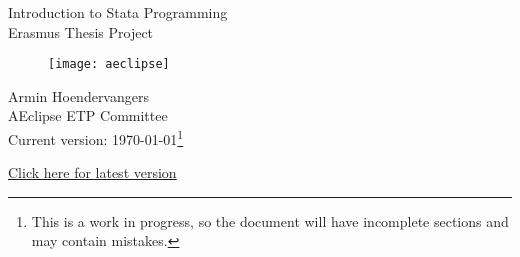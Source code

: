 \begin{titlepage}\thispagestyle{empty}
    \begin{center}
        \vspace*{0.5cm}
        \LARGE
        Introduction to Stata Programming\\
        \Large
        Erasmus Thesis Project\\
        \vspace{1cm}
        \begin{figure}[h]\centering
            \texttt{[image: aeclipse]}
        \end{figure}
        \vfill
        \large
        Armin Hoendervangers\\
        AEclipse ETP Committee\\

        \vspace{2cm}
        Current version: \today\footnote{This is a work in progress, so the document will have incomplete sections and may contain mistakes.}

        \href{https://github.com/Ahvns/ETPreader/raw/main/Introduction%20to%20Stata%20Programming.pdf}{Click here for latest version}

        \vfill
    \end{center}
\end{titlepage}

